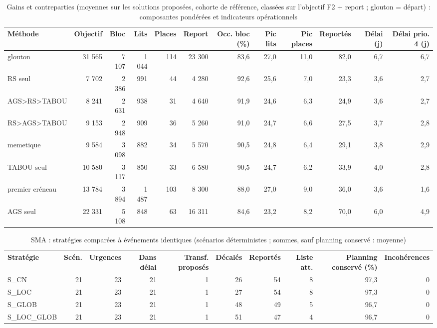 \begin{table}[htbp]
\centering
\small
\caption{Gains et contreparties (moyennes sur les solutions proposées, cohorte de référence, classées sur l'objectif F2 + report ; glouton = départ) : composantes pondérées et indicateurs opérationnels}
\label{tab:compromis}
\begin{tabular}{lrrrrrrrrrrr}
\toprule
Méthode & Objectif & Bloc & Lits & Places & Report & Occ. bloc (\%) & Pic lits & Pic places & Reportés & Délai (j) & Délai prio. 4 (j) \\
\midrule
glouton & 31 565 & 7 107 & 1 044 & 114 & 23 300 & 83,6 & 27,0 & 11,0 & 82,0 & 6,7 & 6,7 \\
RS seul & 7 702 & 2 386 & 991 & 44 & 4 280 & 92,6 & 25,6 & 7,0 & 23,3 & 3,6 & 2,7 \\
AGS\textgreater{}RS\textgreater{}TABOU & 8 241 & 2 631 & 938 & 31 & 4 640 & 91,9 & 24,6 & 6,3 & 24,9 & 3,6 & 2,7 \\
RS\textgreater{}AGS\textgreater{}TABOU & 9 153 & 2 948 & 909 & 36 & 5 260 & 91,0 & 24,7 & 6,6 & 27,5 & 3,7 & 2,8 \\
memetique & 9 584 & 3 098 & 882 & 34 & 5 570 & 90,5 & 24,8 & 6,4 & 29,1 & 3,8 & 2,9 \\
TABOU seul & 10 580 & 3 117 & 850 & 33 & 6 580 & 90,5 & 24,7 & 6,2 & 33,9 & 4,0 & 2,8 \\
premier créneau & 13 784 & 3 894 & 1 487 & 103 & 8 300 & 88,0 & 27,0 & 9,0 & 36,0 & 3,6 & 1,6 \\
AGS seul & 22 331 & 5 108 & 848 & 63 & 16 311 & 84,6 & 23,2 & 8,2 & 70,0 & 6,0 & 4,9 \\
\bottomrule
\end{tabular}
\end{table}

\begin{table}[htbp]
\centering
\small
\caption{SMA : stratégies comparées à événements identiques (scénarios déterministes ; sommes, sauf planning conservé : moyenne)}
\label{tab:sma_strategies}
\begin{tabular}{lrrrrrrrrr}
\toprule
Stratégie & Scén. & Urgences & Dans délai & Transf. proposés & Décalés & Reportés & Liste att. & Planning conservé (\%) & Incohérences \\
\midrule
S\_CN & 21 & 23 & 21 & 1 & 26 & 54 & 8 & 97,3 & 0 \\
S\_LOC & 21 & 23 & 21 & 1 & 27 & 54 & 8 & 97,3 & 0 \\
S\_GLOB & 21 & 23 & 21 & 1 & 48 & 49 & 5 & 96,7 & 0 \\
S\_LOC\_GLOB & 21 & 23 & 21 & 1 & 51 & 47 & 4 & 96,7 & 0 \\
\bottomrule
\end{tabular}
\end{table}

